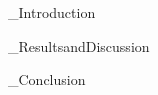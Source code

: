 \documentclass[12pt]{article}
\begin{document}

\TitleSection{}




\ExtendedAbstract{}



\EA_Introduction{} %



\EA_ResultsandDiscussion{} %

\EA_Conclusion{} %



\References{}

\end{document}
